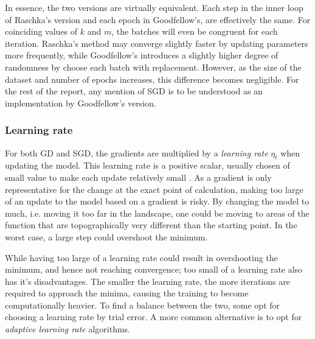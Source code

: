 In essence, the two versions are virtually equivalent. Each step in the inner loop of Raschka's version and each epoch in Goodfellow's, are effectively the same. For coinciding values of $k$ and $m$, the batches will even be congruent for each iteration. Raschka's method may converge slightly faster by updating parameters more frequently, while Goodfellow's introduces a slightly higher degree of randomness by choose each batch with replacement. However, as the size of the dataset and number of epochs increases, this difference becomes negligible.
For the rest of the report, any mention of SGD is to be understood as an implementation by Goodfellow's version.

\subsubsection{Learning rate}
For both GD and SGD, the gradients are multiplied by a \textit{learning rate} $\eta_t$ when updating the model.
This learning rate is a positive scalar, usually chosen of small value to make each update relatively small \citep[p. 84]{Goodfellow-et-al-2016}.
As a gradient is only representative for the change at the exact point of calculation, making too large of an update to the model based on a gradient is risky. By changing the model to much, i.e. moving it too far in the landscape, one could be moving to areas of the function that are topographically very different than the starting point. In the worst case, a large step could overshoot the minimum.

While having too large of a learning rate could result in overshooting the minimum, and hence not reaching convergence; too small of a learning rate also has it's disadvantages. 
The smaller the learning rate, the more iterations are required to approach the minima, causing the training to become computationally heavier. To find a balance between the two, some opt for choosing a learning rate by trial error.
A more common alternative is to opt for \textit{adaptive learning rate} algorithms.

